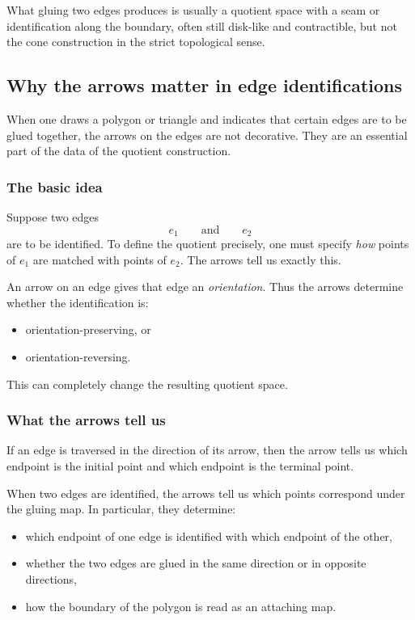 \documentclass[12pt,a4paper]{article}
\theoremstyle{notespace}
\begin{document}
What gluing two edges produces is usually a quotient space with a seam or identification along the boundary, often still disk-like and contractible, but not the cone construction in the strict topological sense.
	

\subsection{Why the arrows matter in edge identifications}

When one draws a polygon or triangle and indicates that certain edges are to be glued together, the arrows on the edges are not decorative. They are an essential part of the data of the quotient construction.

\subsubsection{The basic idea}

Suppose two edges
\[
e_1
\qquad\text{and}\qquad
e_2
\]
are to be identified. To define the quotient precisely, one must specify \emph{how} points of \(e_1\) are matched with points of \(e_2\). The arrows tell us exactly this.

An arrow on an edge gives that edge an \emph{orientation}. Thus the arrows determine whether the identification is:

\begin{itemize}
	\item orientation-preserving, or
	\item orientation-reversing.
\end{itemize}

This can completely change the resulting quotient space.

\subsubsection{What the arrows tell us}

If an edge is traversed in the direction of its arrow, then the arrow tells us which endpoint is the initial point and which endpoint is the terminal point.

When two edges are identified, the arrows tell us which points correspond under the gluing map. In particular, they determine:

\begin{itemize}
	\item which endpoint of one edge is identified with which endpoint of the other,
	\item whether the two edges are glued in the same direction or in opposite directions,
	\item how the boundary of the polygon is read as an attaching map.
\end{itemize}
\end{document}
